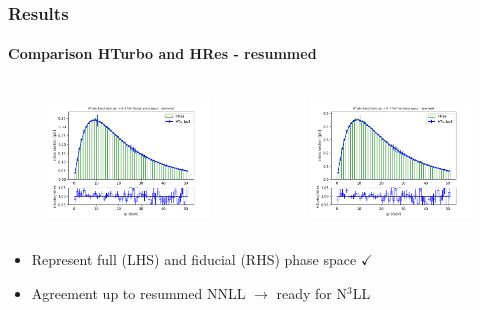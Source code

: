 \documentclass[aspectratio=43]{beamer}
\begin{document}
\begin{frame}
	
	\frametitle{Results}
	\framesubtitle{Comparison HTurbo and HRes - resummed}
	
	\begin{columns}
	
		
		\begin{figure}
			\includegraphics[width = 7cm]{plots/part_III/hturbo_figure_6.png}
		\end{figure}
		
		
		\begin{figure}
			\includegraphics[width = 7cm]{plots/part_III/hturbo_figure_7.png}
		\end{figure}
	
	\end{columns}

	\begin{itemize}
		\item Represent full (LHS) and fiducial (RHS) phase space {\color{darkgreen}$\checkmark$} 
		\item Agreement up to resummed NNLL $\longrightarrow$ {\color{blue}ready for N$^{3}$LL}
	\end{itemize}

\end{frame}
\end{document}

